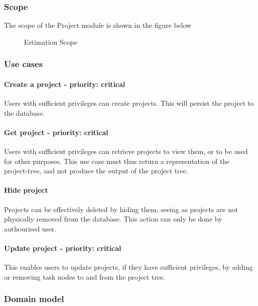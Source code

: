 \subsubsection{Scope}
The scope of the Project module is shown in the figure below
	\begin{figure}[H]
	    	\centering
	    	\caption{Estimation Scope}
	    	\label{fig:Estimation_Scope}
   	\end{figure}
\subsubsection{Use cases}

\paragraph{Create a project - priority: critical}
Users with sufficient privileges can create projects. This will persist the project to the database.

\paragraph{Get project - priority: critical}
Users with sufficient privileges can retrieve projects to view them, or to be used for other purposes. This use case must thus return a representation of the project-tree, and not produce the output of the project tree.

\paragraph{Hide project}
Projects can be effectively deleted by hiding them, seeing as projects are not physically removed from the database. This action can only be done by authourised user.

\paragraph{Update project - priority: critical}
This enables users to update projects, if they have sufficient privileges, by adding or removing task nodes to and from the project tree.

\subsubsection{Domain model}

